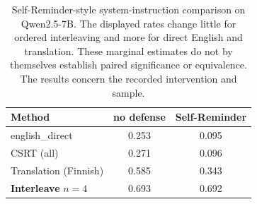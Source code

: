 \begin{table}[t]\centering
\caption{Self-Reminder-style system-instruction comparison on Qwen2.5-7B. The displayed rates change little for ordered interleaving and more for direct English and translation. These marginal estimates do not by themselves establish paired significance or equivalence. The results concern the recorded intervention and sample.}
\label{tab:defense}
\begin{tabular}{l cc}\toprule
Method & no defense & Self-Reminder\\\midrule
english\_direct & 0.253 & 0.095 \\
CSRT (all) & 0.271 & 0.096 \\
Translation (Finnish) & 0.585 & 0.343 \\
\textbf{Interleave} $n{=}4$ & 0.693 & 0.692 \\
\bottomrule\end{tabular}\end{table}
